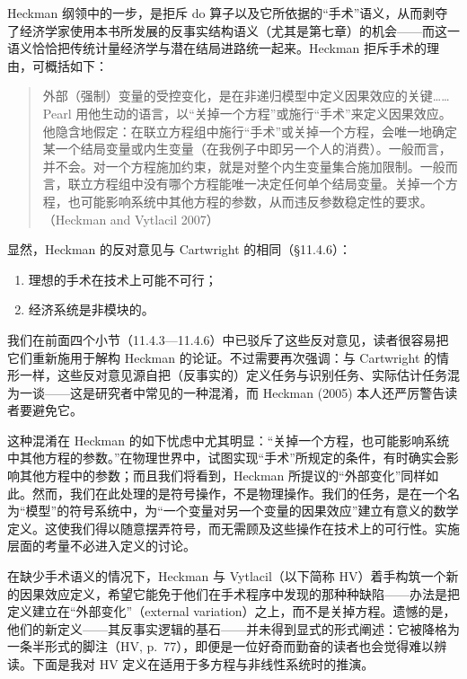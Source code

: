 Heckman 纲领中的一步，是拒斥 do 算子以及它所依据的“手术”语义，从而剥夺了经济学家使用本书所发展的反事实结构语义（尤其是第七章）的机会——而这一语义恰恰把传统计量经济学与潜在结局进路统一起来。Heckman 拒斥手术的理由，可概括如下：

\begin{quote}\kaishu
外部（强制）变量的受控变化，是在非递归模型中定义因果效应的关键……Pearl 用他生动的语言，以“关掉一个方程”或施行“手术”来定义因果效应。他隐含地假定：在联立方程组中施行“手术”或关掉一个方程，会唯一地确定某一个结局变量或内生变量（在我例子中即另一个人的消费）。一般而言，并不会。对一个方程施加约束，就是对整个内生变量集合施加限制。一般而言，联立方程组中没有哪个方程能唯一决定任何单个结局变量。关掉一个方程，也可能影响系统中其他方程的参数，从而违反参数稳定性的要求。（Heckman and Vytlacil 2007）
\end{quote}

显然，Heckman 的反对意见与 Cartwright 的相同（\S11.4.6）：

\begin{enumerate}[label=\arabic*.,leftmargin=1.8em]
\item 理想的手术在技术上可能不可行；
\item 经济系统是非模块的。
\end{enumerate}

我们在前面四个小节（11.4.3—11.4.6）中已驳斥了这些反对意见，读者很容易把它们重新施用于解构 Heckman 的论证。不过需要再次强调：与 Cartwright 的情形一样，这些反对意见源自把（反事实的）定义任务与识别任务、实际估计任务混为一谈——这是研究者中常见的一种混淆，而 Heckman (2005) 本人还严厉警告读者要避免它。

这种混淆在 Heckman 的如下忧虑中尤其明显：“关掉一个方程，也可能影响系统中其他方程的参数。”在物理世界中，试图实现“手术”所规定的条件，有时确实会影响其他方程中的参数；而且我们将看到，Heckman 所提议的“外部变化”同样如此。然而，我们在此处理的是符号操作，不是物理操作。我们的任务，是在一个名为“模型”的符号系统中，为“一个变量对另一个变量的因果效应”建立有意义的数学定义。这使我们得以随意摆弄符号，而无需顾及这些操作在技术上的可行性。实施层面的考量不必进入定义的讨论。


在缺少手术语义的情况下，Heckman 与 Vytlacil（以下简称 HV）着手构筑一个新的因果效应定义，希望它能免于他们在手术程序中发现的那种种缺陷——办法是把定义建立在“外部变化”（external variation）之上，而不是关掉方程。遗憾的是，他们的新定义——其反事实逻辑的基石——并未得到显式的形式阐述：它被降格为一条半形式的脚注（HV, p.~77），即便是一位好奇而勤奋的读者也会觉得难以辨读。下面是我对 HV 定义在适用于多方程与非线性系统时的推演。

